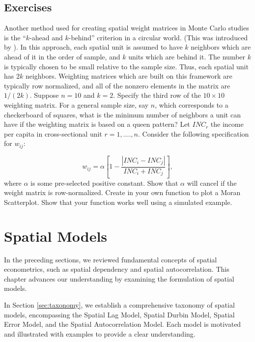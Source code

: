 \documentclass[english,12pt]{book}\usepackage[]{graphicx}\usepackage[]{xcolor}
\begin{document}
\section{Exercises}

\begin{exercises}
 \exercise Another method used for creating spatial weight matrices in Monte Carlo studies is the ``$k$-ahead and $k$-behind'' criterion in a circular world. (This was introduced by \cite{kelejian1999generalized}). In this approach, each spatial unit is assumed to have $k$ neighbors which are ahead of it in the order of sample, and $k$ units which are behind it. The number $k$ is typically chosen to be small relative to the sample size. Thus, each spatial unit has $2k$ neighbors. Weighting matrices which are built on this framework are typically row normalized, and all of the nonzero elements in the matrix are $1/(2k)$. Suppose $n =10$ and $k =2$. Specify the third row of the $10\times 10$ weighting matrix.\label{exercise:k-ahead}
 \exercise For a general sample size, say $n$, which corresponds to a checkerboard of squares, what is the minimum number of neighbors a unit can have if the weighting matrix is based on a queen pattern?
 \exercise  Let $INC_r$ the income per capita in cross-sectional unit $r = 1, ...., n$. Consider the following specification for $w_{ij}$:
	
	\begin{equation*}
	w_{ij}= \alpha\left[1 - \frac{\left|INC_i - INC_j\right|}{INC_i+ INC_j}\right], 
	\end{equation*}
	where $\alpha$ is some pre-selected positive constant. Show that $\alpha$ will cancel if the weight matrix is row-normalized.
	\exercise  Create in  your own function to plot a Moran Scatterplot. Show that your function works well using a simulated example. 
\end{exercises}


\chapter{Spatial Models}

In the preceding sections, we reviewed fundamental concepts of spatial econometrics, such as spatial dependency and spatial autocorrelation. This chapter advances our understanding by examining the formulation of spatial models.

In Section \ref{sec:taxonomy}, we establish a comprehensive taxonomy of spatial models, encompassing the Spatial Lag Model, Spatial Durbin Model, Spatial Error Model, and the Spatial Autocorrelation Model. Each model is motivated and illustrated with examples to provide a clear understanding.
\end{document}

